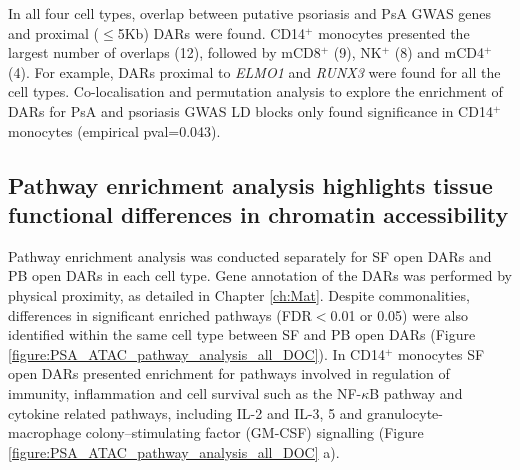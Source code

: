 
In all four cell types, overlap between putative psoriasis and PsA GWAS genes and proximal ($\leq$5Kb) DARs were found. CD14$^+$ monocytes presented the largest number of overlaps (12), followed by mCD8$^+$ (9), NK$^+$ (8) and mCD4$^+$ (4). For example, DARs proximal to \textit{ELMO1} and \textit{RUNX3} were found for all the cell types. Co-localisation and permutation analysis to explore the enrichment of DARs for PsA and psoriasis GWAS LD blocks only found significance in CD14$^+$ monocytes (empirical pval=0.043).

\subsection{Pathway enrichment analysis highlights tissue functional differences in chromatin accessibility}

Pathway enrichment analysis was conducted separately for SF open DARs and PB open DARs in each cell type. Gene annotation of the DARs was performed by physical proximity, as detailed in Chapter \ref{ch:Mat}. Despite commonalities, differences in significant enriched pathways (FDR$<$0.01 or 0.05) were also identified within the same cell type between SF and PB open DARs (Figure \ref{figure:PSA_ATAC_pathway_analysis_all_DOC}). In CD14$^+$ monocytes SF open DARs presented enrichment for pathways involved in regulation of immunity, inflammation and cell survival such as the NF-$\kappa$B pathway and cytokine related pathways, including IL-2 and IL-3, 5 and granulocyte-macrophage colony–stimulating factor (GM-CSF) signalling (Figure \ref{figure:PSA_ATAC_pathway_analysis_all_DOC} a). 

